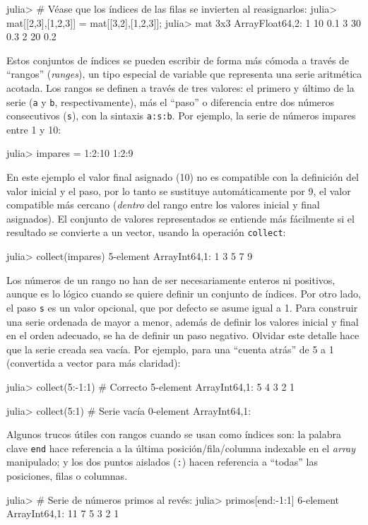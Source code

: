 ﻿\documentclass{article}
\newcommand{\jl}{\texttt}
\begin{document}
julia> # Véase que los índices de las filas se invierten al reasignarlos:
julia> mat[[2,3],[1,2,3]] = mat[[3,2],[1,2,3]];
julia> mat
3x3 Array{Float64,2}:
 1 10 0.1
 3 30 0.3
 2 20 0.2

Estos conjuntos de índices se pueden escribir de forma más cómoda a través de ``rangos'' (\emph{ranges}), un tipo especial de variable que representa una serie aritmética acotada. Los rangos se definen a través de tres valores: el primero y último de la serie (\jl{a} y \jl{b}, respectivamente), más el ``paso'' o diferencia entre dos números consecutivos (\jl{s}), con la sintaxis \jl{a:s:b}. Por ejemplo, la serie de números impares entre 1 y 10:

julia> impares = 1:2:10
1:2:9

En este ejemplo el valor final asignado (10) no es compatible con la definición del valor inicial y el paso, por lo tanto se sustituye automáticamente por 9, el valor compatible más cercano (\emph{dentro} del rango entre los valores inicial y final asignados). El conjunto de valores representados se entiende más fácilmente si el resultado se convierte a un vector, usando la operación \jl{collect}:

julia> collect(impares)
5-element Array{Int64,1}:
 1
 3
 5
 7
 9

Los números de un rango no han de ser necesariamente enteros ni positivos, aunque es lo lógico cuando se quiere definir un conjunto de índices. Por otro lado, el paso \jl{s} es un valor opcional, que por defecto se asume igual a 1. Para construir una serie ordenada de mayor a menor, además de definir los valores inicial y final en el orden adecuado, se ha de definir un paso negativo. Olvidar este detalle hace que la serie creada sea vacía. Por ejemplo, para una ``cuenta atrás'' de 5 a 1 (convertida a vector para más claridad):

julia> collect(5:-1:1) # Correcto
5-element Array{Int64,1}:
 5
 4
 3
 2
 1 

julia> collect(5:1) # Serie vacía
0-element Array{Int64,1}:

Algunos trucos útiles con rangos cuando se usan como índices son: la palabra clave \jl{end} hace referencia a la última posición/fila/columna indexable en el \emph{array} manipulado; y los dos puntos aislados (\jl{:}) hacen referencia a ``todas'' las posiciones, filas o columnas.

julia> # Serie de números primos al revés:
julia> primos[end:-1:1]
6-element Array{Int64,1}:
 11
 7
 5
 3
 2
 1
\end{document}

